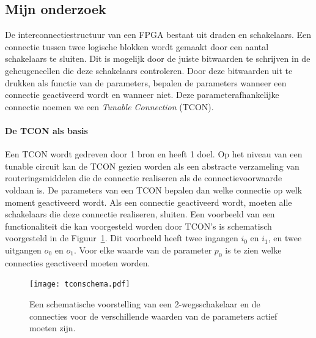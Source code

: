 \documentclass[a4paper,oneside,12pt]{article}
\begin{document}
\subsection{Mijn onderzoek}

De interconnectiestructuur van een FPGA bestaat uit draden en schakelaars. Een connectie tussen twee logische blokken wordt gemaakt door een aantal schakelaars te sluiten. Dit is mogelijk door de juiste bitwaarden te schrijven in de geheugencellen die deze schakelaars controleren. Door deze bitwaarden uit te drukken als functie van de parameters, bepalen de parameters wanneer een connectie geactiveerd wordt en wanneer niet. Deze parameterafhankelijke connectie noemen we een {\em Tunable Connection} (TCON). 

\paragraph{De TCON als basis}
Een TCON wordt gedreven door 1 bron en heeft 1 doel. Op het niveau van een tunable circuit kan de TCON gezien worden als een abstracte verzameling van routeringsmiddelen die de connectie realiseren als de connectievoorwaarde voldaan is. De parameters van een TCON bepalen dan welke connectie op welk moment geactiveerd wordt. Als een connectie geactiveerd wordt, moeten alle schakelaars die deze connectie realiseren, sluiten. Een voorbeeld van een functionaliteit die kan voorgesteld worden door TCON's is schematisch voorgesteld in de Figuur~\ref{tconschema}. Dit voorbeeld heeft twee ingangen $i_0$ en $i_1$, en twee uitgangen $o_0$ en $o_1$. Voor elke waarde van de parameter $p_0$ is te zien welke connecties geactiveerd moeten worden.

\begin{figure}[ht]
\centering
\texttt{[image: tconschema.pdf]}
\caption{Een schematische voorstelling van een 2-wegsschakelaar en de connecties voor de verschillende waarden van de parameters actief moeten zijn.}
\label{tconschema}
\end{figure}
\end{document}
